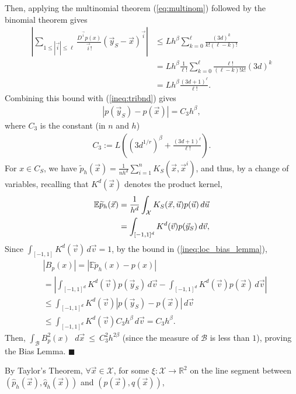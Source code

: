 \documentclass{article}
\renewcommand{\qed}{\quad \ensuremath{\blacksquare}}    %
\newcommand{\R}{\mathbb{R}}                         %
\newcommand{\X}{\mathcal{X}}                        %
\newcommand{\E}{\mathbb{E}}                         %
\newcommand{\cpest}{\widehat{p}_h}                  %
\newcommand{\cqest}{\widehat{q}_h}                  %
\newcommand{\pest}{\widetilde{p}_h}                 %
\newcommand{\vx}{\vec{x}}                           %
\newcommand{\vy}{\vec{y}}                           %
\newcommand{\vv}{\vec{v}}                           %
\newcommand{\vu}{\vec{u}}                           %
\newcommand{\vi}{{\vec{i}}}                         %
\begin{document}
Then, applying the multinomial theorem (\ref{eq:multinom}) followed by the
binomial theorem gives
\begin{align*}
 \left| \sum_{1 \leq |\vi| \leq \ell}
        \frac{D^\vi p(x)}{\vi!} (\vy_S - \vx)^\vi \right|
 & \leq Lh^\beta \sum_{k = 0}^\ell \frac{(3d)^k}{k!(\ell - k)!}   \\
 & =    Lh^\beta \frac{1}{\ell!} \sum_{k = 0}^\ell \frac{\ell!}{(\ell - k)!k!}(3d)^k \\
 & =    Lh^\beta \frac{(3d + 1)^\ell}{\ell!}.
\end{align*}
Combining this bound with (\ref{ineq:tribnd}) gives
\begin{align}
\label{ineq:loc_bias_lemma}
|p(\vy_S) - p(\vx)|
    = C_3 h^\beta,
\end{align}
where $C_3$ is the constant (in $n$ and $h$)
\begin{align}
\label{eq:biasC}
C_3 := L \left( \left( 3d^{1/r} \right)^\beta + \frac{(3d + 1)^\ell}{\ell!} \right).
\end{align}
For $x \in C_S$, we have
$\pest(\vx)  = \frac{1}{nh^d} \sum_{i = 1}^n K_S(\vx,\vx^i)$, and thus, by a
change of variables, recalling that $K^d(\vx)$ denotes the product kernel,
\begin{align}
\notag
\E\pest(\vx)
 &  = \frac{1}{h^d} \int_\X K_S(\vx,\vu) p(\vu) \, d\vu    \\
\label{eq:CoV}
 &  = \int_{[-1,1]^d} K^d(\vv) p(\vy_S) \, d\vv,
\end{align}
Since $\displaystyle \int_{[-1,1]} K^d(\vv) \, d\vv = 1$, by the bound in
(\ref{ineq:loc_bias_lemma}),
\begin{align*}
 & |B_p(x)| = |\E\pest(x) - p(x)|   \\
 & = \left| \int_{[-1,1]^d} K^d(\vv) p(\vy_S) \, d\vv
   - \int_{[-1,1]^d} K^d(\vv) p(\vx) \, d\vv \right| \\
 & \leq \int_{[-1,1]^d} K^d(\vv) |p(\vy_S) - p(\vx)| \, d\vv    \\
 & \leq \int_{[-1,1]^d} K^d(\vv) C_3 h^\beta \, d\vv
   = C_3h^\beta.
\end{align*}
Then, $\int_{\mathcal{B}} B_p^2(x)~\,~d\vx~\leq~C_3^2 h^{2\beta}$ (since the
measure of $\mathcal{B}$ is less than $1$), proving the Bias Lemma. \qed

By Taylor's Theorem, $\forall \vx \in \X$, for some $\xi : \X \to \R^2$ on the
line segment between $(\cpest(\vx),\cqest(\vx))$ and $(p(\vx),q(\vx))$,
\end{document}
